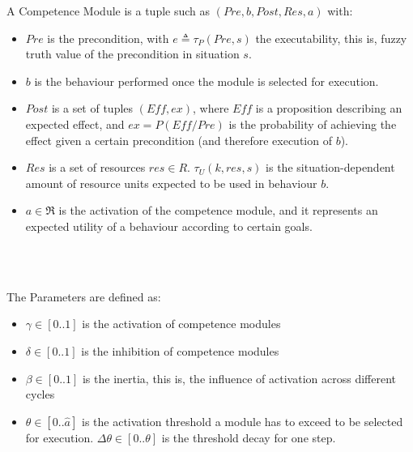 \documentclass[
		twoside,openright,titlepage,numbers=noenddot,manychapters,
		headinclude,%
                footinclude=false,cleardoublepage=empty,
                BCOR=5mm,
		fontsize=11pt, %
                 enabledeprecatedfontcommands]{scrreprt}
\begin{document}
A Competence Module is a tuple such as $(Pre,b,Post,Res,a)$ with:
\begin{itemize}
\item $Pre$ is the precondition, with $e\triangleq \tau_P (Pre,s)$ the executability, this is, fuzzy truth value of the precondition in situation $s$.
\item $b$ is the behaviour performed once the module is selected for execution.
\item $Post$ is a set of tuples $(Eff, ex)$, where $Eff$ is a proposition describing an expected effect, and $ex=P(Eff / Pre)$ is the probability of achieving the effect given a certain precondition (and therefore execution of $b$).
\item $Res$ is a set of resources $res \in R$. $\tau_U(k,res,s)$ is the situation-dependent amount of resource units expected to be used in behaviour $b$.
\item $a \in \Re$ is the activation of the competence module, and it represents an expected utility of a behaviour according to certain goals. %
\end{itemize}
\ \\
 \

The Parameters are defined as:
\begin{itemize}
\item $\gamma \in [0..1]$ is the activation of competence modules
\item $\delta \in [0..1]$   is the inhibition of competence modules
\item $\beta \in [0..1]$    is the inertia, this is, the influence of activation across different cycles
\item $\theta \in [0..\hat a]$  is the activation threshold a module has to exceed to be selected for execution. $\Delta\theta \in [0..\theta]$   is the threshold decay for one step.
\end{itemize}
\end{document}
